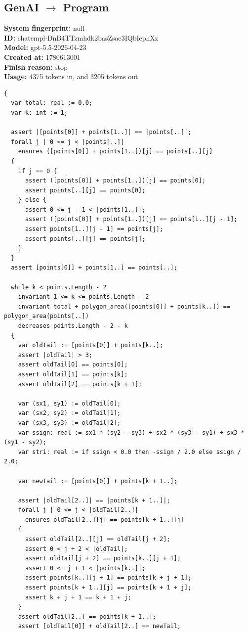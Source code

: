 \documentclass{article}
\begin{document}
\subsection*{GenAI $\rightarrow$ Program}
\textbf{System fingerprint: }null
\\\textbf{ID: }chatcmpl-DnB4TTzmhdk2basZsae3IQbIephXz
\\\textbf{Model: }gpt-5.5-2026-04-23
\\\textbf{Created at: }1780613001
\\\textbf{Finish reason: }stop
\\\textbf{Usage: }4375 tokens in, and 3205 tokens out
\begin{lstlisting}
{
  var total: real := 0.0;
  var k: int := 1;

  assert |[points[0]] + points[1..]| == |points[..]|;
  forall j | 0 <= j < |points[..]|
    ensures ([points[0]] + points[1..])[j] == points[..][j]
  {
    if j == 0 {
      assert ([points[0]] + points[1..])[j] == points[0];
      assert points[..][j] == points[0];
    } else {
      assert 0 <= j - 1 < |points[1..]|;
      assert ([points[0]] + points[1..])[j] == points[1..][j - 1];
      assert points[1..][j - 1] == points[j];
      assert points[..][j] == points[j];
    }
  }
  assert [points[0]] + points[1..] == points[..];

  while k < points.Length - 2
    invariant 1 <= k <= points.Length - 2
    invariant total + polygon_area([points[0]] + points[k..]) == polygon_area(points[..])
    decreases points.Length - 2 - k
  {
    var oldTail := [points[0]] + points[k..];
    assert |oldTail| > 3;
    assert oldTail[0] == points[0];
    assert oldTail[1] == points[k];
    assert oldTail[2] == points[k + 1];

    var (sx1, sy1) := oldTail[0];
    var (sx2, sy2) := oldTail[1];
    var (sx3, sy3) := oldTail[2];
    var ssign: real := sx1 * (sy2 - sy3) + sx2 * (sy3 - sy1) + sx3 * (sy1 - sy2);
    var stri: real := if ssign < 0.0 then -ssign / 2.0 else ssign / 2.0;

    var newTail := [points[0]] + points[k + 1..];

    assert |oldTail[2..]| == |points[k + 1..]|;
    forall j | 0 <= j < |oldTail[2..]|
      ensures oldTail[2..][j] == points[k + 1..][j]
    {
      assert oldTail[2..][j] == oldTail[j + 2];
      assert 0 < j + 2 < |oldTail|;
      assert oldTail[j + 2] == points[k..][j + 1];
      assert 0 <= j + 1 < |points[k..]|;
      assert points[k..][j + 1] == points[k + j + 1];
      assert points[k + 1..][j] == points[k + 1 + j];
      assert k + j + 1 == k + 1 + j;
    }
    assert oldTail[2..] == points[k + 1..];
    assert [oldTail[0]] + oldTail[2..] == newTail;


\end{lstlisting}
\end{document}
